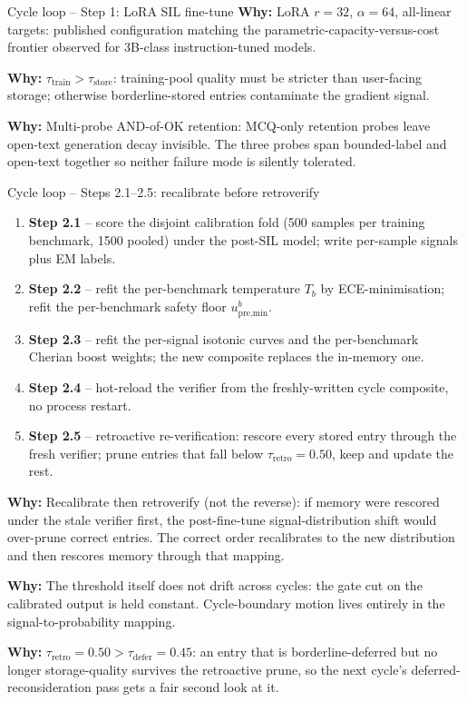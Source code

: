 \documentclass[10pt,aspectratio=169]{beamer}
\newcommand{\why}[1]{{\color{caemamber}\textbf{Why:}} #1}
\begin{document}
\begin{frame}{Cycle loop -- Step 1: LoRA SIL fine-tune}
  \why{LoRA $r{=}32$, $\alpha{=}64$, all-linear targets: published configuration matching the parametric-capacity-versus-cost frontier observed for 3B-class instruction-tuned models.}

  \why{$\tau_{\text{train}} > \tau_{\text{store}}$: training-pool quality must be stricter than user-facing storage; otherwise borderline-stored entries contaminate the gradient signal.}

  \why{Multi-probe AND-of-OK retention: MCQ-only retention probes leave open-text generation decay invisible. The three probes span bounded-label and open-text together so neither failure mode is silently tolerated.}
\end{frame}

\begin{frame}{Cycle loop -- Steps 2.1--2.5: recalibrate before retroverify}
  \scriptsize
  \begin{enumerate}\scriptsize
    \item \textbf{Step 2.1} -- score the disjoint calibration fold (500 samples per training benchmark, 1500 pooled) under the post-SIL model; write per-sample signals plus EM labels.
    \item \textbf{Step 2.2} -- refit the per-benchmark temperature $T_b$ by ECE-minimisation; refit the per-benchmark safety floor $u_{\text{pre,min}}^b$.
    \item \textbf{Step 2.3} -- refit the per-signal isotonic curves and the per-benchmark Cherian boost weights; the new composite replaces the in-memory one.
    \item \textbf{Step 2.4} -- hot-reload the verifier from the freshly-written cycle composite, no process restart.
    \item \textbf{Step 2.5} -- retroactive re-verification: rescore every stored entry through the fresh verifier; prune entries that fall below $\tau_{\text{retro}}=0.50$, keep and update the rest.
  \end{enumerate}

  \why{Recalibrate then retroverify (not the reverse): if memory were rescored under the stale verifier first, the post-fine-tune signal-distribution shift would over-prune correct entries. The correct order recalibrates to the new distribution and then rescores memory through that mapping.}

  \why{The threshold itself does not drift across cycles: the gate cut on the calibrated output is held constant. Cycle-boundary motion lives entirely in the signal-to-probability mapping.}

  \why{$\tau_{\text{retro}} = 0.50 > \tau_{\text{defer}} = 0.45$: an entry that is borderline-deferred but no longer storage-quality survives the retroactive prune, so the next cycle's deferred-reconsideration pass gets a fair second look at it.}
\end{frame}
\end{document}
